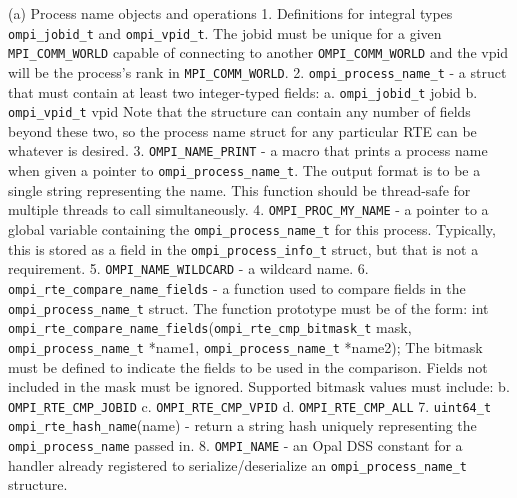  (a) Process name objects and operations
     1. Definitions for integral types \verb|ompi_jobid_t| and \verb|ompi_vpid_t|.
        The jobid must be unique for a given \verb|MPI_COMM_WORLD| capable of
        connecting to another \verb|OMPI_COMM_WORLD| and the vpid will be the
        process's rank in \verb|MPI_COMM_WORLD|.
     2. \verb|ompi_process_name_t| - a struct that must contain at least two integer-typed fields:
           a. \verb|ompi_jobid_t| jobid
           b. \verb|ompi_vpid_t| vpid
        Note that the structure can contain any number of fields beyond these
        two, so the process name struct for any particular RTE can be whatever
        is desired.
     3. \verb|OMPI_NAME_PRINT| - a macro that prints a process name when given
        a pointer to \verb|ompi_process_name_t|. The output format is to be
        a single string representing the name.  This function should
        be thread-safe for multiple threads to call simultaneously.
     4. \verb|OMPI_PROC_MY_NAME| - a pointer to a global variable containing
        the \verb|ompi_process_name_t| for this process. Typically, this is
        stored as a field in the \verb|ompi_process_info_t| struct, but that
        is not a requirement.
     5. \verb|OMPI_NAME_WILDCARD| - a wildcard name.
     6. \verb|ompi_rte_compare_name_fields| - a function used to compare fields
        in the \verb|ompi_process_name_t| struct. The function prototype must be
        of the form:
        int \verb|ompi_rte_compare_name_fields|(\verb|ompi_rte_cmp_bitmask_t| mask,                                        \verb|ompi_process_name_t| *name1,
                                         \verb|ompi_process_name_t| *name2);
        The bitmask must be defined to indicate the fields to be used
        in the comparison. Fields not included in the mask must be ignored.
        Supported bitmask values must include:
           b. \verb|OMPI_RTE_CMP_JOBID|
           c. \verb|OMPI_RTE_CMP_VPID|
           d. \verb|OMPI_RTE_CMP_ALL|
      7. \verb|uint64_t ompi_rte_hash_name|(name) - return a string hash uniquely
         representing the \verb|ompi_process_name| passed in.
      8. \verb|OMPI_NAME| - an Opal DSS constant for a handler already registered
         to serialize/deserialize an \verb|ompi_process_name_t| structure.

